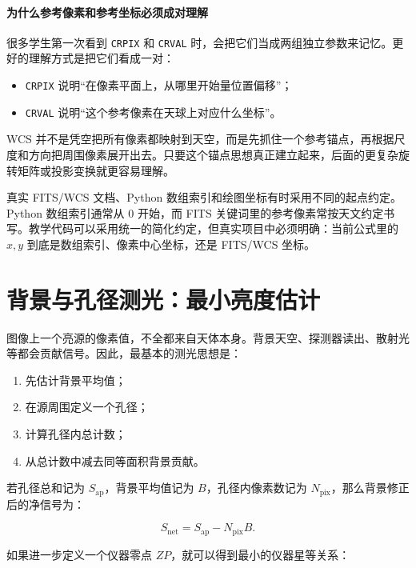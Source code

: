 \paragraph{为什么参考像素和参考坐标必须成对理解}

很多学生第一次看到 \texttt{CRPIX} 和 \texttt{CRVAL} 时，会把它们当成两组独立参数来记忆。更好的理解方式是把它们看成一对：

\begin{itemize}
    \item \texttt{CRPIX} 说明“在像素平面上，从哪里开始量位置偏移”；
    \item \texttt{CRVAL} 说明“这个参考像素在天球上对应什么坐标”。
\end{itemize}

WCS 并不是凭空把所有像素都映射到天空，而是先抓住一个参考锚点，再根据尺度和方向把周围像素展开出去。只要这个锚点思想真正建立起来，后面的更复杂旋转矩阵或投影变换就更容易理解。

\begin{warnbox}[像素坐标约定必须先说清楚]
真实 FITS/WCS 文档、Python 数组索引和绘图坐标有时采用不同的起点约定。Python 数组索引通常从 $0$ 开始，而 FITS 关键词里的参考像素常按天文约定书写。教学代码可以采用统一的简化约定，但真实项目中必须明确：当前公式里的 $x,y$ 到底是数组索引、像素中心坐标，还是 FITS/WCS 坐标。
\end{warnbox}

\section{背景与孔径测光：最小亮度估计}

图像上一个亮源的像素值，不全都来自天体本身。背景天空、探测器读出、散射光等都会贡献信号。因此，最基本的测光思想是：

\begin{enumerate}
    \item 先估计背景平均值；
    \item 在源周围定义一个孔径；
    \item 计算孔径内总计数；
    \item 从总计数中减去同等面积背景贡献。
\end{enumerate}

若孔径总和记为 $S_{\mathrm{ap}}$，背景平均值记为 $B$，孔径内像素数记为 $N_{\mathrm{pix}}$，那么背景修正后的净信号为：

\[
S_{\mathrm{net}} = S_{\mathrm{ap}} - N_{\mathrm{pix}} B.
\]

如果进一步定义一个仪器零点 $ZP$，就可以得到最小的仪器星等关系：

